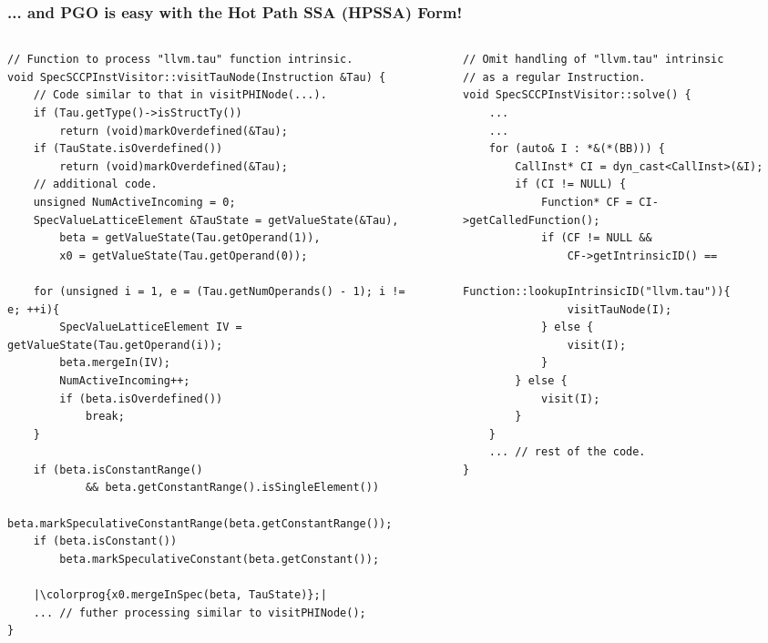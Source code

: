 \documentclass[aspectratio=169, compress]{beamer}
\newcommand{\colorprog}[1]{\colorbox{aquamarine}{#1}}
\begin{document}
\begin{frame}[fragile]
	\frametitle{... and PGO is easy with the Hot Path SSA (HPSSA) Form!}
	\begin{columns}
		\begin{column}{0.5\textwidth}
	\begin{verbatim}
// Function to process "llvm.tau" function intrinsic.
void SpecSCCPInstVisitor::visitTauNode(Instruction &Tau) {
	// Code similar to that in visitPHINode(...).
	if (Tau.getType()->isStructTy())
    	return (void)markOverdefined(&Tau);
	if (TauState.isOverdefined())
		return (void)markOverdefined(&Tau);
	// additional code.
	unsigned NumActiveIncoming = 0;
	SpecValueLatticeElement &TauState = getValueState(&Tau), 
		beta = getValueState(Tau.getOperand(1)), 
		x0 = getValueState(Tau.getOperand(0));
	
	for (unsigned i = 1, e = (Tau.getNumOperands() - 1); i != e; ++i){
		SpecValueLatticeElement IV = getValueState(Tau.getOperand(i));
		beta.mergeIn(IV);
		NumActiveIncoming++;
		if (beta.isOverdefined())
			break;
	}
	 
	if (beta.isConstantRange() 
			&& beta.getConstantRange().isSingleElement())
		beta.markSpeculativeConstantRange(beta.getConstantRange());
	if (beta.isConstant())
		beta.markSpeculativeConstant(beta.getConstant());
		
	|\colorprog{x0.mergeInSpec(beta, TauState)};|
	... // futher processing similar to visitPHINode();
}
\end{verbatim}
		\end{column}
	\begin{column}{0.01\textwidth} \end{column}
		\begin{column}{0.4\textwidth}  
			\begin{verbatim}
// Omit handling of "llvm.tau" intrinsic 
// as a regular Instruction.
void SpecSCCPInstVisitor::solve() {
	...
	...
	for (auto& I : *&(*(BB))) {
		CallInst* CI = dyn_cast<CallInst>(&I);
		if (CI != NULL) {
			Function* CF = CI->getCalledFunction();
			if (CF != NULL &&
				CF->getIntrinsicID() == 
			  Function::lookupIntrinsicID("llvm.tau")){
				visitTauNode(I);
			} else {
				visit(I);
			} 
		} else {
			visit(I);
		}
	}
	... // rest of the code.
}


\end{verbatim}
\end{column}
\end{columns}
\end{frame}
\end{document}

